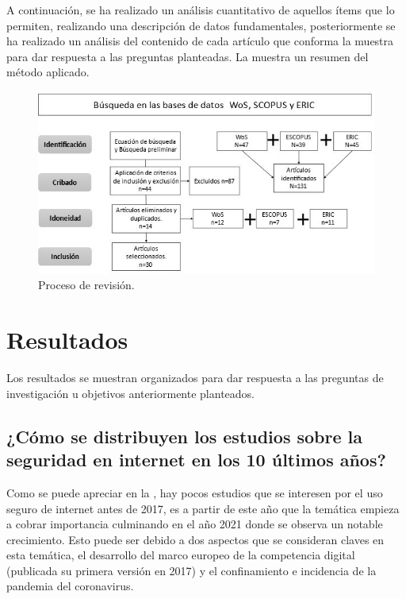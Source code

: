 \documentclass[spanish]{textolivre}
\begin{document}
A continuación, se ha realizado un análisis cuantitativo de aquellos ítems que lo permiten, realizando una descripción de datos fundamentales, posteriormente se ha realizado un análisis del contenido de cada artículo que conforma la muestra para dar respuesta a las preguntas planteadas. La  muestra un resumen del método aplicado.

\begin{figure}[h]
\centering
\begin{minipage}{0.75\textwidth}
\includegraphics[width=\textwidth]{Fig3.png}
\caption{Proceso de revisión.}
\label{fig3}
\end{minipage}
\end{figure}

\section{Resultados}\label{sec-fmt-manuscrito}
Los resultados se muestran organizados para dar respuesta a las preguntas de investigación u objetivos anteriormente planteados.


\subsection{¿Cómo se distribuyen los estudios sobre la seguridad en internet en los 10 últimos años?}\label{sec-formato}
Como se puede apreciar en la , hay pocos estudios que se interesen por el uso seguro de internet antes de 2017, es a partir de este año que la temática empieza a cobrar importancia culminando en el año 2021 donde se observa un notable crecimiento. Esto puede ser debido a dos aspectos que se consideran claves en esta temática, el desarrollo del marco europeo de la competencia digital (publicada su primera versión en 2017) y el confinamiento e incidencia de la pandemia del coronavirus.
\end{document}
